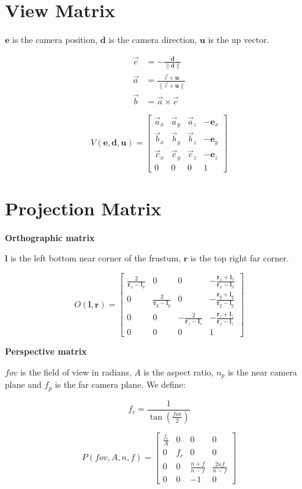 \section{View Matrix}

$\mathbf{e}$ is the camera position, $\mathbf{d}$ is the camera direction, $\mathbf{u}$ is the up vector.

\begin{equation*}
\begin{split}
\vec{c} &= -\frac{\mathbf{d}}{\|\mathbf{d}\|} \\
\vec{a} &= \frac{\vec{c} \times \mathbf{u}}{\|\vec{c} \times \mathbf{u}\|} \\
\vec{b} &= \vec{a} \times \vec{c} 
\end{split}
\end{equation*}

$$
V(\mathbf{e},\mathbf{d},\mathbf{u}) = \left[\begin{array}{cccc}
\vec{a}_x & \vec{a}_y & \vec{a}_z & -\mathbf{e}_x      \\
\vec{b}_x & \vec{b}_y & \vec{b}_z & -\mathbf{e}_y        \\
\vec{c}_x & \vec{c}_y & \vec{c}_z & -\mathbf{e}_z       \\
0 & 0 & 0 & 1
\end{array}\right]$$

\section{Projection Matrix}

\textbf{Orthographic matrix}

$\mathbf{l}$ is the left bottom near corner of the frustum, $\mathbf{r}$ is the top right far corner.

$$
O(\mathbf{l},\mathbf{r}) = \left[\begin{array}{cccc}
\frac{2}{\mathbf{r}_x-\mathbf{l}_x} & 0 & 0 & -\frac{\mathbf{r}_x+\mathbf{l}_x}{\mathbf{r}_x-\mathbf{l}_x}       \\
0 & \frac{2}{\mathbf{r}_y-\mathbf{l}_y} & 0 & -\frac{\mathbf{r}_y+\mathbf{l}_y}{\mathbf{r}_y-\mathbf{l}_y}      \\
0 & 0 &  - \frac{2}{\mathbf{r}_z-\mathbf{l}_z} & -\frac{\mathbf{r}_z+\mathbf{l}_z}{\mathbf{r}_z-\mathbf{l}_z}      \\
0 & 0 & 0 & 1
\end{array}\right]
$$

\textbf{Perspective matrix}

$fov$ is the field of view in radians, $A$ is the aspect ratio, $n_p$ is the near camera plane and $f_p$ is the far camera plane. We define:

$$
f_c = \frac{1}{\tan(\frac{fov}{2})}
$$

$$
P(fov,A,n,f) = \left[\begin{array}{cccc}
\frac{f_c}{A} & 0 & 0 & 0       \\
0 & f_c & 0 & 0       \\
0 & 0 & \frac{n + f}{n - f} & \frac{2 n f}{n-f}      \\
0 & 0 & -1 & 0
\end{array}\right]
$$


